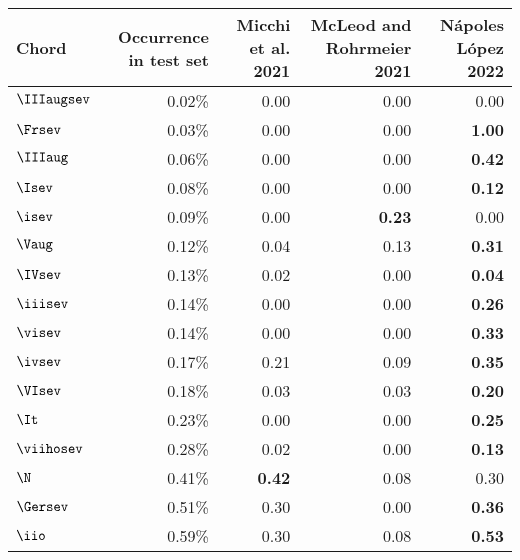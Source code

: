 \begin{tabular}{l|rrrr}
Chord & Occurrence in test set & Micchi et al. 2021 & McLeod and Rohrmeier 2021 & Nápoles López 2022 \\
\hline
$\IIIaugsev$ & 0.02\%                 & 0.00                 & 0.00                        & 0.00           \\
$\Frsev$     & 0.03\%                 & 0.00                 & 0.00                        & \textbf{1.00}  \\
$\IIIaug$    & 0.06\%                 & 0.00                 & 0.00                        & \textbf{0.42}  \\
$\Isev$      & 0.08\%                 & 0.00                 & 0.00                        & \textbf{0.12}  \\
$\isev$      & 0.09\%                 & 0.00                 & \textbf{0.23}               & 0.00           \\
$\Vaug$      & 0.12\%                 & 0.04                 & 0.13                        & \textbf{0.31}  \\
$\IVsev$     & 0.13\%                 & 0.02                 & 0.00                        & \textbf{0.04}  \\
$\iiisev$    & 0.14\%                 & 0.00                 & 0.00                        & \textbf{0.26}  \\
$\visev$     & 0.14\%                 & 0.00                 & 0.00                        & \textbf{0.33}  \\
$\ivsev$     & 0.17\%                 & 0.21                 & 0.09                        & \textbf{0.35}  \\
$\VIsev$     & 0.18\%                 & 0.03                 & 0.03                        & \textbf{0.20}  \\
$\It$        & 0.23\%                 & 0.00                 & 0.00                        & \textbf{0.25}  \\
$\viihosev$  & 0.28\%                 & 0.02                 & 0.00                        & \textbf{0.13}  \\
$\N$         & 0.41\%                 & \textbf{0.42}        & 0.08                        & 0.30           \\
$\Gersev$    & 0.51\%                 & 0.30                 & 0.00                        & \textbf{0.36}  \\
$\iio$       & 0.59\%                 & 0.30                 & 0.08                        & \textbf{0.53}  \\

\end{tabular}
